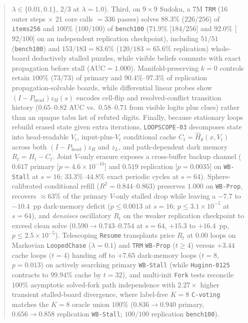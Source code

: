 \documentclass[10pt,letterpaper]{article}
\newcommand{\Phead}{P_{\mathrm{head}}}
\begin{document}
\begin{abstract}
$\lambda \in \{0.01, 0.1\}$, $2/3$ at $\lambda=1.0$). Third, on $9\times 9$ Sudoku, a 7M \texttt{TRM} (16 outer steps $\times$ 21 core calls $= 336$ passes) solves $88.3\%$ ($226/256$) of \texttt{items256} and $100\%$ ($100/100$) of \texttt{bench100} ($71.9\%$ [$184/256$] and $92.0\%$ [$92/100$] on an independent replication checkpoint), including $51/51$ (\texttt{bench100}) and $153/183 = 83.6\%$ ($120/183 = 65.6\%$ replication) whole-board deductively stalled puzzles, while visible beliefs commute with exact propagation before stall ($\mathrm{AUC}=1.000$). Manifold-preserving $k=0$ controls retain $100\%$ ($73/73$) of primary and $90.4\%$--$97.3\%$ of replication propagation-solvable boards, while differential linear probes show $(I-\Phead)z_H(s)$ encodes cell-flip and resolved-conflict transition history ($0.65$--$0.82$ AUC vs.\ $0.58$--$0.71$ from visible logits plus clues) rather than an opaque tabu list of refuted digits. Finally, because stationary loops rebuild erased state given extra iterations, \texttt{LOOPSCOPE-03} decomposes state into head-readable $V_t$, input-plus-$V_t$ conditional cache $C_t = \hat{H}_\theta(x,V_t)$ across both $(I-\Phead)z_H$ and $z_L$, and path-dependent dark memory $R_t = H_t - C_t$. Joint $V$-only erasure exposes a cross-buffer backup channel ($0.617$ primary [$p=4.6\times 10^{-10}$] and $0.519$ replication [$p=0.0035$] on \texttt{WB-Stall} at $s=16$; $33.3\%$--$44.8\%$ exact periodic cycles at $s=64$). Sphere-calibrated conditional refill ($R^2 = 0.844$--$0.863$) preserves $1.000$ on \texttt{WB-Prop}, recovers $\approx 63\%$ of the primary $V$-only stalled drop while leaving a $-7.7$ to $-10.4$~pp dark-memory deficit ($p \le 0.0013$ at $s=16$; $p \le 3.1\times 10^{-5}$ at $s=64$), and \emph{denoises} oscillatory $R_t$ on the weaker replication checkpoint to exceed clean solve ($0.590 \to 0.743$--$0.754$ at $s=64$, $+15.3$ to $+16.4$~pp, $p \le 2.5\times 10^{-5}$). Telescoping \texttt{Resume} transplants price $R_t$ at $0.00$ loops on Markovian \texttt{LoopedChase} ($\lambda=0.1$) and \texttt{TRM} \texttt{WB-Prop} ($t \ge 4$) versus $+3.44$ cache loops ($t=4$) handing off to $+7.65$ dark-memory loops ($t=8$, $p=0.013$) on actively searching primary \texttt{WB-Stall} (while \texttt{Huginn-0125} contracts to $99.94\%$ cache by $t=32$), and multi-init \texttt{Fork} tests reconcile $100\%$ asymptotic solved-fork path independence \cite{anil2022path} with $2.27\times$ higher transient stalled-board divergence, where label-free $K=8$ \texttt{C-voting} \cite{kubo2026cvoting} matches the $K=8$ oracle union $100\%$ ($0.836 \to 0.940$ primary, $0.656 \to 0.858$ replication \texttt{WB-Stall}; $100/100$ replication \texttt{bench100}).
\end{abstract}
\end{document}
